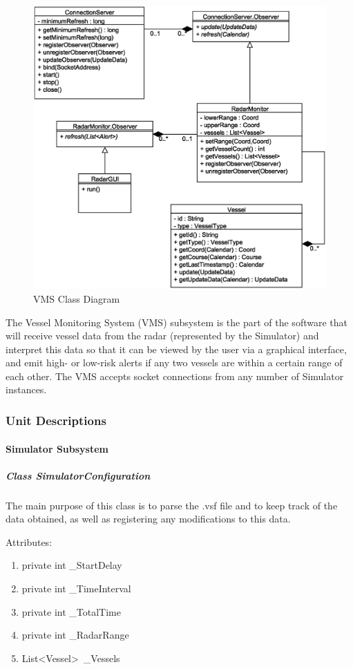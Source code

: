 \documentclass{article}
\begin{document}
\begin{figure}[!htb]
\caption{VMS Class Diagram}
\centering
\includegraphics[scale=0.7]{diagrams/vms-class-diagram.eps}
\end{figure}
The Vessel Monitoring System (VMS) subsystem is the part of the software that will receive vessel data from the radar (represented by the Simulator) and interpret this data so that it can be viewed by the user via a graphical interface, and emit high- or low-risk alerts if any two vessels are within a certain range of each other. The VMS accepts socket connections from any number of Simulator instances.

\break
\subsubsection{Unit Descriptions} %

\paragraph{Simulator Subsystem}

\subparagraph{Class SimulatorConfiguration}
The main purpose of this class is to parse the .vsf file and to keep track of the data obtained, as well as registering any modifications to this data.

\vspace{0.5cm}
Attributes:
\begin{enumerate}
    \item private int \_StartDelay
    \item private int \_TimeInterval
    \item private int \_TotalTime
    \item private int \_RadarRange
    \item List\textless Vessel\textgreater \, \_Vessels
\end {enumerate}
\end{document}
